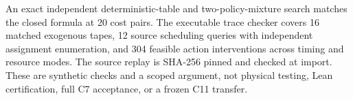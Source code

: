 \documentclass[11pt]{article}
\begin{document}
An exact independent deterministic-table and two-policy-mixture search matches the closed formula at 20 cost pairs. The executable trace checker covers 16 matched exogenous tapes, 12 source scheduling queries with independent assignment enumeration, and 304 feasible action interventions across timing and resource modes. The source replay is SHA-256 pinned and checked at import. These are synthetic checks and a scoped argument, not physical testing, Lean certification, full C7 acceptance, or a frozen C11 transfer.
\end{document}
